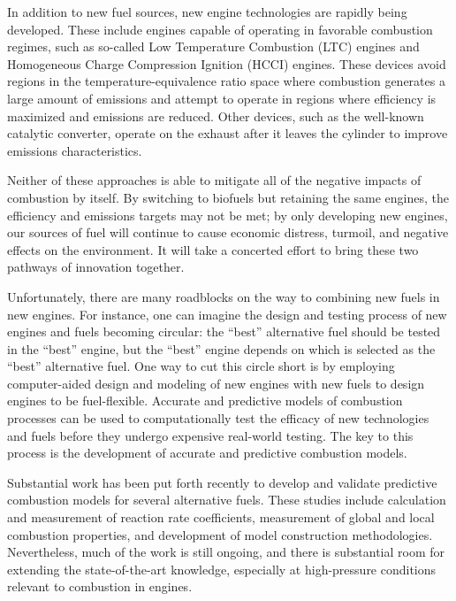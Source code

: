 \documentclass[12pt, letterpaper]{article}
\begin{document}
In addition to new fuel sources, new engine technologies are rapidly being 
developed. These include engines capable of operating in favorable combustion 
regimes, such as so-called Low Temperature Combustion (LTC) engines and 
Homogeneous Charge Compression Ignition (HCCI) engines. These devices avoid 
regions in the temperature-equivalence ratio space where combustion generates a 
large amount of emissions and attempt to operate in regions where efficiency is 
maximized and emissions are reduced. Other devices, such as the well-known 
catalytic converter, operate on the exhaust after it leaves the cylinder to 
improve emissions characteristics.

Neither of these approaches is able to mitigate all of the negative impacts of 
combustion by itself. By switching to biofuels but retaining the same engines, 
the efficiency and emissions targets may not be met; by only developing new 
engines, our sources of fuel will continue to cause economic distress, turmoil, 
and negative effects on the environment. It will take a concerted effort to 
bring these two pathways of innovation together.

Unfortunately, there are many roadblocks on the way to combining new fuels in 
new engines. For instance, one can imagine the design and testing process of 
new engines and fuels becoming circular: the ``best'' alternative fuel should be 
tested in the ``best'' engine, but the ``best'' engine depends on which is selected 
as the ``best'' alternative fuel. One way to cut this circle short is by 
employing computer-aided design and modeling of new engines with new fuels to 
design engines to be fuel-flexible. Accurate and predictive models of 
combustion processes can be used to computationally test the efficacy of new 
technologies and fuels before they undergo expensive real-world testing. The 
key to this process is the development of accurate and predictive combustion 
models.

Substantial work has been put forth recently to develop and validate predictive 
combustion models for several alternative fuels. These studies include 
calculation and measurement of reaction rate coefficients, measurement of 
global and local combustion properties, and development of model construction 
methodologies. Nevertheless, much of the work is still ongoing, and there is 
substantial room for extending the state-of-the-art knowledge, especially at 
high-pressure conditions relevant to combustion in engines.
\end{document}

